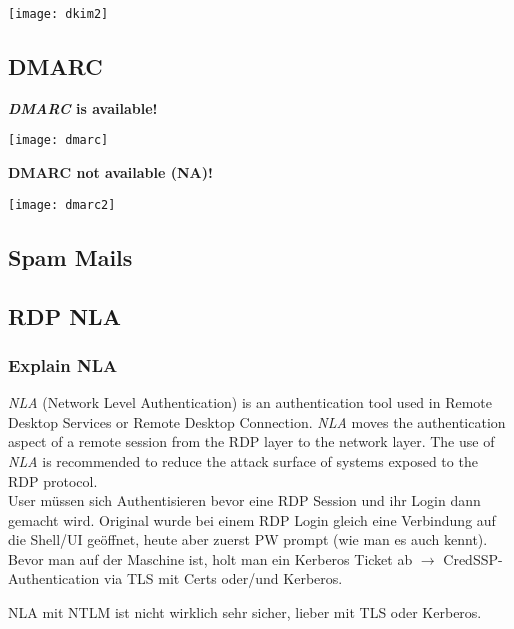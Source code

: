 \begin{center}
    \texttt{[image: dkim2]}
\end{center}

\subsection{DMARC}
\textbf{\textit{DMARC} is available!}

\begin{center}
    \texttt{[image: dmarc]}
\end{center}

\textbf{DMARC not available (NA)!}
\begin{center}
    \texttt{[image: dmarc2]}
\end{center}

\newpage

\subsection{Spam Mails}

\newpage

\subsection{RDP NLA}

\subsubsection{Explain NLA}
\textit{NLA} (Network Level Authentication) is an authentication tool used in Remote Desktop Services or Remote Desktop Connection.
\textit{NLA} moves the authentication aspect of a remote session from the RDP layer to the network layer. The use of \textit{NLA} is recommended to reduce the attack surface of systems exposed to the RDP protocol.\\

User müssen sich Authentisieren bevor eine RDP Session und ihr Login dann gemacht wird.
Original wurde bei einem RDP Login gleich eine Verbindung auf die Shell/UI geöffnet, heute aber zuerst PW prompt (wie man es auch kennt).
Bevor man auf der Maschine ist, holt man ein Kerberos Ticket ab $\rightarrow$ CredSSP-Authentication via TLS mit Certs oder/und Kerberos. 

NLA mit NTLM ist nicht wirklich sehr sicher, lieber mit TLS oder Kerberos.\\

